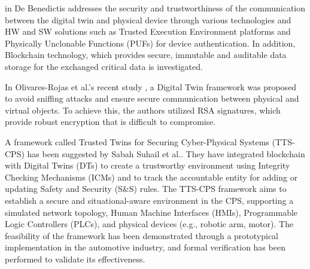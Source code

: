 in\cite{debenedictisAdoptionSecureCyber2022} De Benedictis addresses the security and trustworthiness of the communication between the digital twin and physical device through various technologies and HW and SW solutions such as Trusted Execution Environment platforms and Physically Unclonable Functions (PUFs) for device authentication. In addition,  Blockchain technology, which provides secure, immutable and auditable data storage for the exchanged critical data is investigated. 

In Olivares-Rojas et al.'s recent study \cite{olivares-rojasCybersecuritySmartGrid2022}, a Digital Twin framework was proposed to avoid sniffing attacks and ensure secure communication between physical and virtual objects. To achieve this, the authors utilized RSA signatures, which provide robust encryption that is difficult to compromise.

A framework called Trusted Twins for Securing Cyber-Physical Systems (TTS-CPS) has been suggested by Sabah Suhail et al.\cite{suhailSituationalAwareCyberphysical2022}. They have integrated blockchain with Digital Twins (DTs) to create a trustworthy environment using Integrity Checking Mechanisms (ICMs) and to track the accountable entity for adding or updating Safety and Security (S\&S) rules. The TTS-CPS framework aims to establish a secure and situational-aware environment in the CPS, supporting a simulated network topology, Human Machine Interfaces (HMIs), Programmable Logic Controllers (PLCs), and physical devices (e.g., robotic arm, motor). The feasibility of the framework has been demonstrated through a prototypical implementation in the automotive industry, and formal verification has been performed to validate its effectiveness.